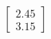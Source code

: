 \documentclass[preview]{standalone}
\begin{document}
\begin{align*}
\begin{bmatrix} 2.45 \\ 3.15 \end{bmatrix}
\end{align*}
\end{document}
